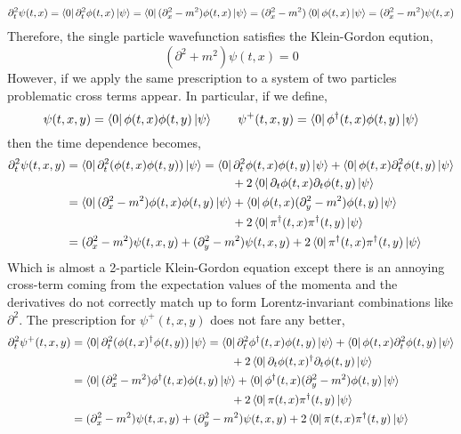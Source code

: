 \documentclass[12pt]{extarticle}
\begin{document}
\begin{align*}
\partial_t^2 \psi(t, x) = \left< 0 \right| \partial_t^2 \phi(t, x) \left| \psi \right> = \left< 0 \right| (\partial_x^2 - m^2) \phi(t, x) \left| \psi \right> = (\partial_x^2 - m^2) \left< 0 \right|  \phi(t, x) \left| \psi \right> = (\partial_x^2 - m^2) \psi(t, x)
\end{align*}
Therefore, the single particle wavefunction satisfies the Klein-Gordon eqution,
\[ \left( \partial^2 + m^2 \right) \psi(t, x) = 0 \]
However, if we apply the same prescription to a system of two particles problematic cross terms appear. In particular, if we define,
\[ \psi(t, x, y) = \left< 0 \right| \phi(t, x) \phi(t, y) \left| \psi \right>  \quad \quad \psi^+(t, x, y) = \left< 0 \right| \phi^\dagger(t, x) \phi(t, y) \left| \psi \right> \] 
then the time dependence becomes,
\begin{align*}
\partial_t^2 \psi(t, x, y) & = \left< 0 \right| \partial_t^2  (\phi(t, x) \phi(t, y)) \left| \psi \right> = \left< 0 \right|  \partial_t^2 \phi(t, x) \phi(t, y) \left| \psi \right> + \left< 0 \right|  \phi(t, x) \partial_t^2 \phi(t, y) \left| \psi \right> 
\\
& \qquad \qquad \qquad \qquad \qquad \qquad \qquad + 2 \left< 0 \right| \partial_t \phi(t, x) \partial_t \phi(t, y) \left| \psi \right> 
\\
& = \left< 0 \right|  (\partial_x^2 - m^2) \phi(t, x) \phi(t, y) \left| \psi \right> + \left< 0 \right|  \phi(t, x) (\partial_y^2 - m^2) \phi(t, y) \left| \psi \right> 
\\
& \qquad \qquad \qquad \qquad \qquad \qquad \qquad + 2 \left< 0 \right| \pi^\dagger(t, x) \pi^\dagger(t, y) \left| \psi \right> 
\\
& = (\partial_x^2 - m^2) \psi(t, x, y) + (\partial_y^2 - m^2) \psi(t, x, y) + 2 \left< 0 \right| \pi^\dagger(t, x) \pi^\dagger(t, y) \left| \psi \right> 
\end{align*}
Which is almost a 2-particle Klein-Gordon equation except there is an annoying cross-term coming from the expectation values of the momenta and the derivatives do not correctly match up to form Lorentz-invariant combinations like $\partial^2$. The prescription for $\psi^{+}(t, x, y)$ does not fare any better,
\begin{align*}
\partial_t^2 \psi^+(t, x, y) & = \left< 0 \right| \partial_t^2  (\phi(t, x)^\dagger \phi(t, y)) \left| \psi \right> = \left< 0 \right|  \partial_t^2 \phi^\dagger(t, x) \phi(t, y) \left| \psi \right> + \left< 0 \right|  \phi(t, x) \partial_t^2 \phi(t, y) \left| \psi \right> 
\\
& \qquad \qquad \qquad \qquad \qquad \qquad \qquad + 2 \left< 0 \right| \partial_t \phi(t, x)^\dagger \partial_t \phi(t, y) \left| \psi \right> 
\\
& = \left< 0 \right|  (\partial_x^2 - m^2) \phi^\dagger(t, x) \phi(t, y) \left| \psi \right> + \left< 0 \right|  \phi^\dagger(t, x) (\partial_y^2 - m^2) \phi(t, y) \left| \psi \right> 
\\
& \qquad \qquad \qquad \qquad \qquad \qquad \qquad + 2 \left< 0 \right| \pi(t, x) \pi^\dagger(t, y) \left| \psi \right> 
\\
& = (\partial_x^2 - m^2) \psi(t, x, y) + (\partial_y^2 - m^2) \psi(t, x, y) + 2 \left< 0 \right| \pi(t, x) \pi^\dagger(t, y) \left| \psi \right> 
\end{align*}
\end{document}
